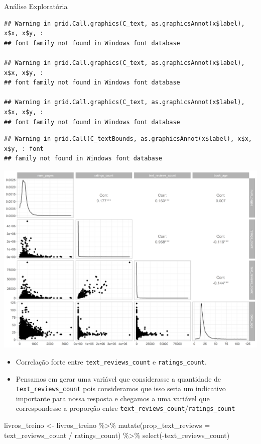 \documentclass[
  9 pt,
  ignorenonframetext,
]{beamer}
\newenvironment{Shaded}{\begin{snugshade}}{\end{snugshade}}
\newcommand{\AttributeTok}[1]{\textcolor[rgb]{0.77,0.63,0.00}{#1}}
\newcommand{\FunctionTok}[1]{\textcolor[rgb]{0.00,0.00,0.00}{#1}}
\newcommand{\NormalTok}[1]{#1}
\newcommand{\OtherTok}[1]{\textcolor[rgb]{0.56,0.35,0.01}{#1}}
\newcommand{\SpecialCharTok}[1]{\textcolor[rgb]{0.00,0.00,0.00}{#1}}
\providecommand{\tightlist}{%
  \setlength{\itemsep}{0pt}\setlength{\parskip}{0pt}}
\begin{document}
\begin{frame}[fragile]{Análise Exploratória}
\begin{verbatim}
## Warning in grid.Call.graphics(C_text, as.graphicsAnnot(x$label), x$x, x$y, :
## font family not found in Windows font database

## Warning in grid.Call.graphics(C_text, as.graphicsAnnot(x$label), x$x, x$y, :
## font family not found in Windows font database

## Warning in grid.Call.graphics(C_text, as.graphicsAnnot(x$label), x$x, x$y, :
## font family not found in Windows font database
\end{verbatim}

\begin{verbatim}
## Warning in grid.Call(C_textBounds, as.graphicsAnnot(x$label), x$x, x$y, : font
## family not found in Windows font database
\end{verbatim}

\includegraphics{apresentacao_files/figure-beamer/unnamed-chunk-4-1.png}

\begin{itemize}
\tightlist
\item
  Correlação forte entre \texttt{text\_reviews\_count} e
  \texttt{ratings\_count}.
\item
  Pensamos em gerar uma variável que considerasse a quantidade de
  \texttt{text\_reviews\_count} pois consideramos que isso seria um
  indicativo importante para nossa resposta e chegamos a uma variável
  que correspondesse a proporção entre
  \texttt{text\_reviews\_count}/\texttt{ratings\_count}
\end{itemize}

\begin{Shaded}
\begin{Highlighting}[]
\NormalTok{livros\_treino }\OtherTok{\textless{}{-}}\NormalTok{ livros\_treino }\SpecialCharTok{\%\textgreater{}\%} 
  \FunctionTok{mutate}\NormalTok{(}\AttributeTok{prop\_text\_reviews =}\NormalTok{ text\_reviews\_count }\SpecialCharTok{/}\NormalTok{ ratings\_count) }\SpecialCharTok{\%\textgreater{}\%} 
  \FunctionTok{select}\NormalTok{(}\SpecialCharTok{{-}}\NormalTok{text\_reviews\_count)}


\end{Highlighting}
\end{Shaded}
\end{frame}
\end{document}
